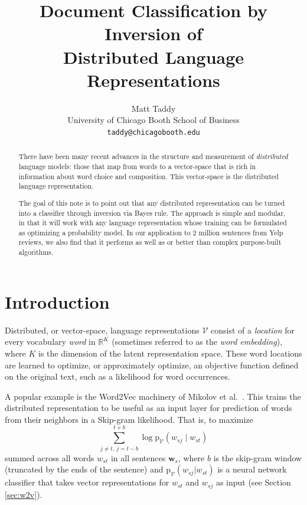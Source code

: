\documentclass[11pt]{article}
\title{Document Classification by Inversion of \\Distributed Language Representations}
\author{Matt Taddy \\
  University of Chicago Booth School of Business \\
  {\tt taddy@chicagobooth.edu} \\}
\date{}
\begin{document}
\maketitle
\begin{abstract}
There have been many recent advances in the structure and measurement of {\it distributed} language models: those that map from words to a vector-space that is rich in information about word choice and composition.  This vector-space is the distributed language representation.


The goal of this note is to point out that any distributed  representation can be turned into a classifier through inversion via Bayes rule.  
The approach is simple and modular, in that it will work with any language representation whose training can be formulated as optimizing a probability model. In our application to 2 million sentences from Yelp reviews, we also find that it performs as well as or better than  complex purpose-built algorithms. \end{abstract}

\section{Introduction}

Distributed, or vector-space, language representations $\mathcal{V}$ consist
of a {\it location} for every vocabulary {\it word} in $\mathds{R}^K$
(sometimes referred to as the {\it word embedding}), where $K$ is the
dimension of the latent representation space.  These word locations are
learned to optimize, or approximately optimize, an objective function defined
on the original text, such as a likelihood for word occurrences.

A popular example is the Word2Vec machinery of
Mikolov et al.~.  This trains the distributed
representation to be useful as an input layer for prediction of words from
their neighbors in a Skip-gram likelihood.  That is, to maximize
\begin{equation}\label{eq:skipgram}
\sum_{j\neq t,~j=t-b}^{t+b} \log\mathrm{p}_{\mathcal{V}}(w_{sj}\mid w_{st})
\end{equation}
summed across all words $w_{st}$ in all sentences $\mathbf{w}_s$, where $b$ is
the skip-gram window (truncated by the ends of the
sentence) and  $\mathrm{p}_{\mathcal{V}}(w_{sj}| w_{st})$ is a neural network
classifier that takes vector representations for $w_{st}$ and $w_{sj}$
as input (see Section \ref{sec:w2v}).  
\end{document}
